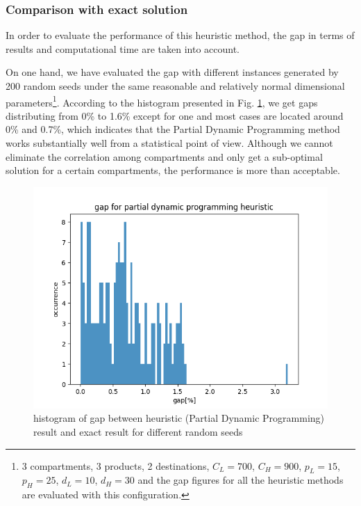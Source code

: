 \documentclass{article}
\begin{document}
\subsubsection{Comparison with exact solution}
In order to evaluate the performance of this heuristic method, the gap in terms of results and computational time are taken into account.

On one hand, we have evaluated the gap with different instances generated by 200 random seeds under the same reasonable and relatively normal dimensional parameters\footnote{3 compartments, 3 products, 2 destinations, $C_L=700$, $C_H=900$, $p_L=15$, $p_H=25$, $d_L=10$, $d_H=30$ and the gap figures for all the heuristic methods are evaluated with this configuration.}. According to the histogram presented in Fig. \ref{fig:hist_pdp}, we get gaps distributing from 0\% to 1.6\% except for one and most cases are located around 0\% and 0.7\%, which indicates that the Partial Dynamic Programming method works substantially well from a statistical point of view. Although we cannot eliminate the correlation among compartments and only get a sub-optimal solution for a certain compartments, the performance is more than acceptable.

\begin{figure}[ht]
    \centering
    \includegraphics[scale=0.7]{hist_pdp.png}
    \caption{histogram of gap between heuristic (Partial Dynamic Programming) result and exact result for different random seeds}
    \label{fig:hist_pdp}
\end{figure}
\end{document}
